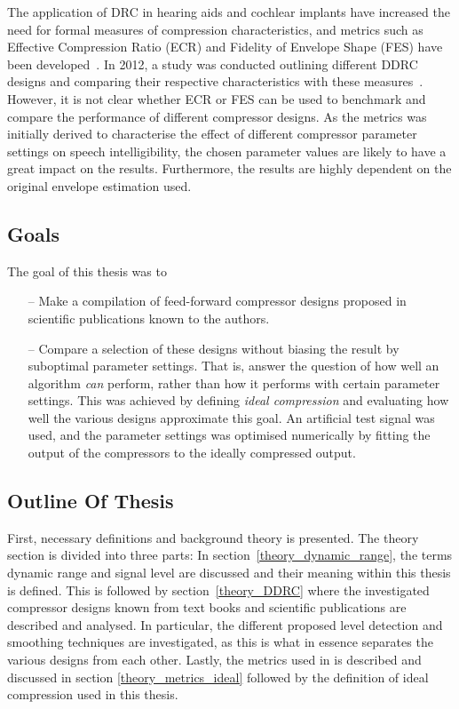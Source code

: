 \documentclass[../main2.tex]{subfiles}
\begin{document}
The application of DRC in hearing aids and cochlear implants have increased the need for formal measures of compression characteristics, and metrics such as Effective Compression Ratio (ECR) and Fidelity of Envelope Shape (FES) have been developed~\cite{stone1992syllabic, stone2007quantifying}. In 2012, a study was conducted outlining different DDRC designs and comparing their respective characteristics with these measures~\cite{reiss2012tutorial}. However, it is not clear whether ECR or FES can be used to benchmark and compare the performance of different compressor designs. As the metrics was initially derived to characterise the effect of different compressor parameter settings on speech intelligibility, the chosen parameter values are likely to have a great impact on the results. Furthermore, the results are highly dependent on the original envelope estimation used.

\subsection{Goals}
The goal of this thesis was to
\begin{itemize}
\item[--] Make a compilation of feed-forward compressor designs proposed in scientific publications known to the authors.
\item[--] Compare a selection of these designs without biasing the result by suboptimal parameter settings. That is, answer the question of how well an algorithm \emph{can} perform, rather than how it performs with certain parameter settings. This was achieved by defining \emph{ideal compression} and evaluating how well the various designs approximate this goal. An artificial test signal was used, and the parameter settings was optimised numerically by fitting the output of the compressors to the ideally compressed output.
\end{itemize}

\subsection{Outline Of Thesis}
First, necessary definitions and background theory is presented. The theory section is divided into three parts: In section~\ref{theory_dynamic_range}, the terms dynamic range and signal level are discussed and their meaning within this thesis is defined. This is followed by section~\ref{theory_DDRC} where the investigated compressor designs known from text books and scientific publications are described and analysed. In particular, the different proposed level detection and smoothing techniques are investigated, as this is what in essence separates the various designs from each other. Lastly, the metrics used in \cite{stone1992syllabic, stone2007quantifying, reiss2012tutorial} is described and discussed in section \ref{theory_metrics_ideal} followed by the definition of ideal compression used in this thesis.
\end{document}
